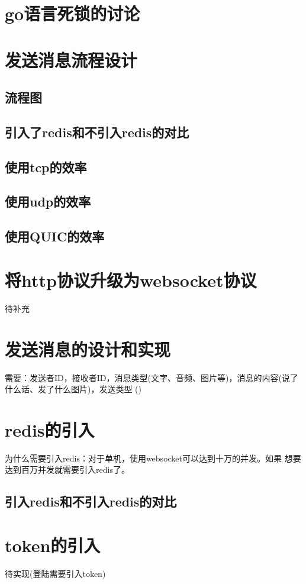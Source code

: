 \documentclass[12pt]{article}
\begin{document}
	\section{go语言死锁的讨论}
	\section{发送消息流程设计}
	\subsection{流程图}
	\subsection{引入了redis和不引入redis的对比}
	\subsection{使用tcp的效率}
	\subsection{使用udp的效率}
	\subsection{使用QUIC的效率}
	\section{将http协议升级为websocket协议}
	待补充
	\section{发送消息的设计和实现}
	需要：发送者ID，接收者ID，消息类型(文字、音频、图片等)，消息的内容(说了什么话、发了什么图片)，发送类型
	()
	
	\section{redis的引入}
	
	为什么需要引入redis：对于单机，使用websocket可以达到十万的并发。如果
	想要达到百万并发就需要引入redis了。
	\subsection{引入redis和不引入redis的对比}
	
	\section{token的引入}
	待实现(登陆需要引入token)
\end{document}
